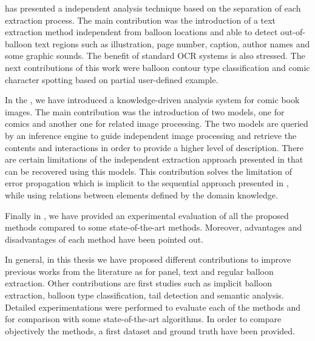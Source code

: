  has presented a independent analysis technique based on the separation of each extraction process.
The main contribution was the introduction of a text extraction method independent from balloon locations and able to detect out-of-balloon text regions such as illustration, page number, caption, author names and some graphic sounds.
The benefit of standard OCR systems is also stressed.
The next contributions of this work were balloon contour type classification and comic character spotting based on partial user-defined example.

In the , we have introduced a knowledge-driven analysis system for comic book images.
The main contribution was the introduction of two models, one for comics and another one for related image processing.
The two models are queried by an inference engine to guide independent image processing and retrieve the contents and interactions in order to provide a higher level of description.
There are certain limitations of the independent extraction approach presented in  that can be recovered using this models.
This contribution solves the limitation of error propagation which is implicit to the sequential approach presented in , while using relations between elements defined by the domain knowledge.

Finally in , we have provided an experimental evaluation of all the proposed methods compared to some state-of-the-art methods.
Moreover, advantages and disadvantages of each method have been pointed out.

In general, in this thesis we have proposed different contributions to improve previous works from the literature as for panel, text and regular balloon extraction.
Other contributions are first studies such as implicit balloon extraction, balloon type classification, tail detection and semantic analysis.
Detailed experimentations were performed to evaluate each of the methods and for comparison with some state-of-the-art algorithms.
In order to compare objectively the methods, a first dataset and ground truth have been provided.

